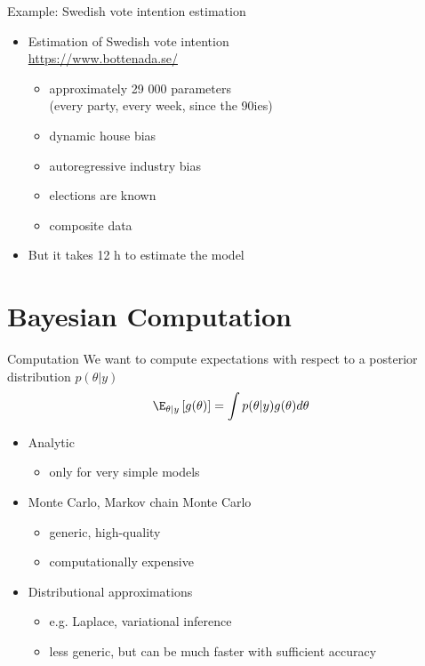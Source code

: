 \documentclass[10pt]{beamer}
\begin{document}
\begin{frame}{Example: Swedish vote intention estimation}

  \begin{itemize}
  \item Estimation of Swedish vote intention\\
  \url{https://www.bottenada.se/}
  \begin{itemize}
  \item approximately 29 000 parameters \\(every party, every week, since the 90ies)
  \item dynamic house bias
  \item autoregressive industry bias
  \item elections are known
  \item composite data
  \end{itemize}
  \pause
  \item But it takes 12 h to estimate the model
  \end{itemize}
\end{frame}


\section{Bayesian Computation}
\frame{\sectionpage}

\begin{frame}{Computation}
  We want to compute expectations with respect to a posterior
  distribution $p(\theta|y)$
  \begin{align*}
    \E_{\theta|y}\left[ g(\theta) \right] = \int p(\theta|y)g(\theta) d\theta
  \end{align*}

  \begin{itemize}
  \item Analytic
    \begin{itemize}
    \item only for very simple models
    \end{itemize}
  \item Monte Carlo, Markov chain Monte Carlo
    \begin{itemize}
    \item generic, high-quality
    \item computationally expensive
    \end{itemize}
  \item Distributional approximations
    \begin{itemize}
    \item e.g. Laplace, variational inference
    \item less generic, but can be much faster with sufficient accuracy
    \end{itemize}
  \end{itemize}
\end{frame}
\end{document}
